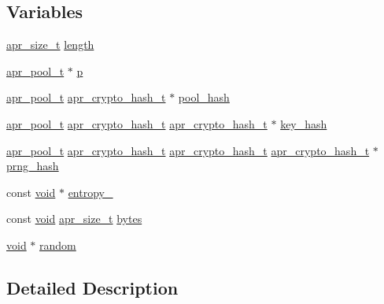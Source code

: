 \subsection*{Variables}
\begin{DoxyCompactItemize}
\item 
\hyperlink{group__apr__platform_gaaa72b2253f6f3032cefea5712a27540e}{apr\+\_\+size\+\_\+t} \hyperlink{group__apr__random_ga1e201727989c3a1c4901ee4c30d2e8fa}{length}
\item 
\hyperlink{structapr__pool__t}{apr\+\_\+pool\+\_\+t} $\ast$ \hyperlink{group__apr__random_ga2e727f881424334cf12d8af10f50ec6c}{p}
\item 
\hyperlink{structapr__pool__t}{apr\+\_\+pool\+\_\+t} \hyperlink{structapr__crypto__hash__t}{apr\+\_\+crypto\+\_\+hash\+\_\+t} $\ast$ \hyperlink{group__apr__random_ga467948cb4cf4e6c6531ec82add319f77}{pool\+\_\+hash}
\item 
\hyperlink{structapr__pool__t}{apr\+\_\+pool\+\_\+t} \hyperlink{structapr__crypto__hash__t}{apr\+\_\+crypto\+\_\+hash\+\_\+t} \hyperlink{structapr__crypto__hash__t}{apr\+\_\+crypto\+\_\+hash\+\_\+t} $\ast$ \hyperlink{group__apr__random_ga8cfe7466d86884deb41f9260608ef429}{key\+\_\+hash}
\item 
\hyperlink{structapr__pool__t}{apr\+\_\+pool\+\_\+t} \hyperlink{structapr__crypto__hash__t}{apr\+\_\+crypto\+\_\+hash\+\_\+t} \hyperlink{structapr__crypto__hash__t}{apr\+\_\+crypto\+\_\+hash\+\_\+t} \hyperlink{structapr__crypto__hash__t}{apr\+\_\+crypto\+\_\+hash\+\_\+t} $\ast$ \hyperlink{group__apr__random_gac92511b46c28b5d66795bde787ad8f84}{prng\+\_\+hash}
\item 
const \hyperlink{group__MOD__ISAPI_gacd6cdbf73df3d9eed42fa493d9b621a6}{void} $\ast$ \hyperlink{group__apr__random_ga0feb49c6530af6eb997e0937caa0f144}{entropy\+\_\+}
\item 
const \hyperlink{group__MOD__ISAPI_gacd6cdbf73df3d9eed42fa493d9b621a6}{void} \hyperlink{group__apr__platform_gaaa72b2253f6f3032cefea5712a27540e}{apr\+\_\+size\+\_\+t} \hyperlink{group__apr__random_ga393b167dab644f408202cbbcad070e6d}{bytes}
\item 
\hyperlink{group__MOD__ISAPI_gacd6cdbf73df3d9eed42fa493d9b621a6}{void} $\ast$ \hyperlink{group__apr__random_gac93942ec5efab7a3d75b75e70c8c7a94}{random}
\end{DoxyCompactItemize}


\subsection{Detailed Description}



